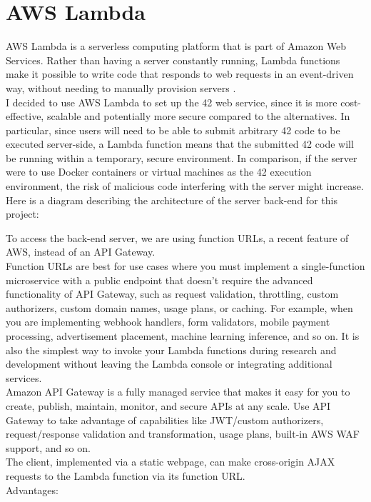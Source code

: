 \section{AWS Lambda}

AWS Lambda is a serverless computing platform that is part of Amazon Web Services. Rather than having a server constantly running, Lambda functions make it possible to write code that responds to web requests in an event-driven way, without needing to manually provision servers \cite{amazon-web-services-inc-2022A}.
\\[12pt]
I decided to use AWS Lambda to set up the 42 web service, since it is more cost-effective, scalable and potentially more secure compared to the alternatives. In particular, since users will need to be able to submit arbitrary 42 code to be executed server-side, a Lambda function means that the submitted 42 code will be running within a temporary, secure environment. In comparison, if the server were to use Docker containers or virtual machines as the 42 execution environment, the risk of malicious code interfering with the server might increase.
\\[12pt]
Here is a diagram describing the architecture of the server back-end for this project:


To access the back-end server, we are using function URLs, a recent feature of AWS, instead of an API Gateway.
\\[12pt]
Function URLs are best for use cases where you must implement a single-function microservice with a public endpoint that doesn't require the advanced functionality of API Gateway, such as request validation, throttling, custom authorizers, custom domain names, usage plans, or caching. For example, when you are implementing webhook handlers, form validators, mobile payment processing, advertisement placement, machine learning inference, and so on. It is also the simplest way to invoke your Lambda functions during research and development without leaving the Lambda console or integrating additional services.
\\[12pt]
Amazon API Gateway is a fully managed service that makes it easy for you to create, publish, maintain, monitor, and secure APIs at any scale. Use API Gateway to take advantage of capabilities like JWT/custom authorizers, request/response validation and transformation, usage plans, built-in AWS WAF support, and so on. \cite{casalboni-2022}
\\[12pt]
The client, implemented via a static webpage, can make cross-origin AJAX requests to the Lambda function via its function URL.
\\[12pt]
Advantages:


